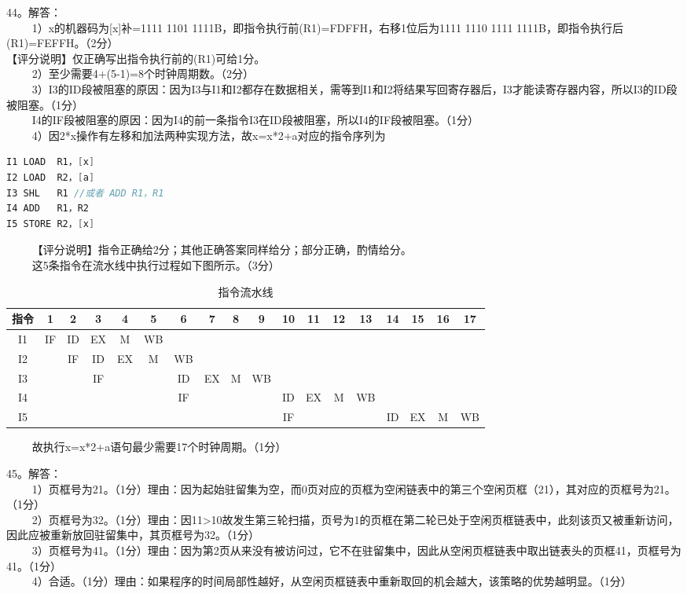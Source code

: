 44。解答： \\
$\qquad$ 1）x的机器码为[x]补=1111 1101 1111B，即指令执行前(R1)=FDFFH，右移1位后为1111 1110 1111 1111B，即指令执行后(R1)=FEFFH。（2分） \\
【评分说明】仅正确写出指令执行前的(R1)可给1分。 \\
$\qquad$ 2）至少需要4+(5-1)=8个时钟周期数。（2分） \\
$\qquad$ 3）I3的ID段被阻塞的原因：因为I3与I1和I2都存在数据相关，需等到I1和I2将结果写回寄存器后，I3才能读寄存器内容，所以I3的ID段被阻塞。（1分） \\
$\qquad$ I4的IF段被阻塞的原因：因为I4的前一条指令I3在ID段被阻塞，所以I4的IF段被阻塞。（1分） \\
$\qquad$ 4）因2*x操作有左移和加法两种实现方法，故x=x*2+a对应的指令序列为 \\
\begin{lstlisting}[language=cpp]
I1 LOAD  R1，[x]
I2 LOAD  R2，[a]
I3 SHL   R1 //或者 ADD R1，R1
I4 ADD   R1，R2
I5 STORE R2，[x]
\end{lstlisting}
$\qquad$ 【评分说明】指令正确给2分；其他正确答案同样给分；部分正确，酌情给分。 \\
$\qquad$ 这5条指令在流水线中执行过程如下图所示。（3分）
\begin{table}[ht]
\centering
\caption{指令流水线}\label{tab_CSN12_8}
\begin{tabular}{|c|c|c|c|c|c|c|c|c|c|c|c|c|c|c|c|c|c|}
\hline
指令 & 1 & 2 & 3 & 4 & 5 & 6 & 7 & 8 & 9 & 10 & 11 & 12 & 13 & 14 & 15 & 16 & 17 \\
\hline
I1 & IF & ID & EX & M & WB &  &  &  &  &  &  &  &  &  &  &  &  \\
\hline
I2 &  & IF & ID & EX & M & WB &  &  &  &  &  &  &  &  &  &  &  \\
\hline
I3 &  &  & IF &  &  & ID & EX & M & WB &  &  &  &  &  &  &  &  \\
\hline
I4 &  &  &  &  &  & IF &  &  &  & ID & EX & M & WB & &  &  &  \\
\hline
I5 &  &  &  &  &  &  &  &  &  & IF &  &  &  & ID & EX & M & WB \\
\hline
\end{tabular}
\end{table}
$\qquad$ 故执行x=x*2+a语句最少需要17个时钟周期。（1分）

45。解答：\\
$\qquad$ 1）页框号为21。（1分）理由：因为起始驻留集为空，而0页对应的页框为空闲链表中的第三个空闲页框（21），其对应的页框号为21。（1分） \\
$\qquad$ 2）页框号为32。（1分）理由：因11>10故发生第三轮扫描，页号为1的页框在第二轮已处于空闲页框链表中，此刻该页又被重新访问，因此应被重新放回驻留集中，其页框号为32。（1分） \\
$\qquad$ 3）页框号为41。（1分）理由：因为第2页从来没有被访问过，它不在驻留集中，因此从空闲页框链表中取出链表头的页框41，页框号为41。（1分） \\
$\qquad$ 4）合适。（1分）理由：如果程序的时间局部性越好，从空闲页框链表中重新取回的机会越大，该策略的优势越明显。（1分）

